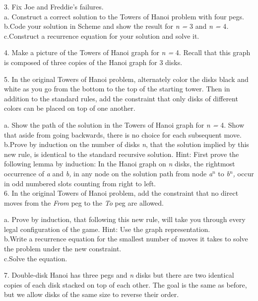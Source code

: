 \documentclass{article}
\newcommand{\tab}{\makebox[4em]{}}
\begin{document}
3.\tab 
Fix Joe and Freddie's failures.\\
a.\tab 
Construct a correct solution to the Towers of Hanoi problem with 
four pegs. \\
b.\tab Code your solution in Scheme and show the result for \textit{n 
=} 3 and \textit{n =} 4\textit{.}\\
c.\tab Construct a recurrence equation for your solution and solve 
it.


4.\tab 
Make a picture of the Towers of Hanoi graph for \textit{n =} 4. Recall 
that this graph is composed of three copies of the Hanoi graph 
for 3 disks.


5.\tab 
In the original Towers of Hanoi problem, alternately color the 
disks black and white as you go from the bottom to the top of 
the starting tower. Then in addition to the standard rules, add 
the constraint that only disks of different colors can be placed 
on top of one another.


a.\tab 
Show the path of the solution in the Towers of Hanoi graph for \textit{n 
=} 4. Show that aside from going backwards, there is no choice 
for each subsequent move.\\
b.\tab Prove by induction on the number of disks \textit{n}, that the solution 
implied by this new rule, is identical to the standard recursive 
solution. Hint: First prove the following lemma by induction: 
In the Hanoi graph on \textit{n} disks, the rightmost occurrence of \textit{a} and \textit{b,} in 
any node on the solution path from node \textit{a}$^{\mathit{n}}$ to \textit{b}$^{\mathit{n}}$\textit{,} occur 
in odd numbered slots counting from right to left. \\
6.\tab 
In the original Towers of Hanoi problem, add the constraint that 
no direct moves from the \textit{From} peg to the \textit{To} peg are allowed.


a.\tab 
Prove by induction, that following this new rule, will take you 
through every legal configuration of the game. Hint: Use the 
graph representation.\\
b.\tab Write a recurrence equation for the smallest number of moves 
it takes to solve the problem under the new constraint.\\
c.\tab Solve the equation.


7.\tab 
Double-disk Hanoi has three pegs and \textit{n} disks but there are 
two identical copies of each disk stacked on top of each other. 
The goal is the same as before, but we allow disks of the same 
size to reverse their order.
\end{document}
